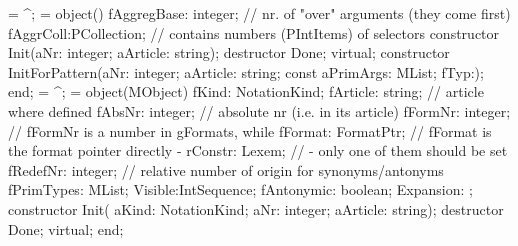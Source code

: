  = ^;
  =
  object()
     fAggregBase: integer;      // nr. of "over" arguments (they come first)
     fAggrColl:PCollection;     // contains numbers (PIntItems) of selectors
   constructor Init(aNr: integer; aArticle: string);
   destructor Done; virtual;
   constructor InitForPattern(aNr: integer; aArticle: string;
                              const aPrimArgs: MList; fTyp:);
  end;
\eatline
{}\nwendcode{}\nwdocspar
\nwenddocs{}\endmoddef\nwstartdeflinemarkup{}\nwenddeflinemarkup
   = ^;
   = object(MObject)
   fKind: NotationKind;
   fArticle: string;    // article where defined
   fAbsNr: integer;     // absolute nr (i.e. in its article)
   fFormNr: integer;    // fFormNr is a number in gFormats, while
   fFormat: FormatPtr;  // fFormat is the format pointer directly -
   rConstr: Lexem;      // - only one of them should be set
   fRedefNr: integer;     // relative number of origin for synonyms/antonyms
   fPrimTypes: MList;
   Visible:IntSequence;
   fAntonymic: boolean;
   Expansion: ;
   constructor Init( aKind: NotationKind; aNr: integer; aArticle: string);
   destructor Done; virtual;
  end;
\eatline
